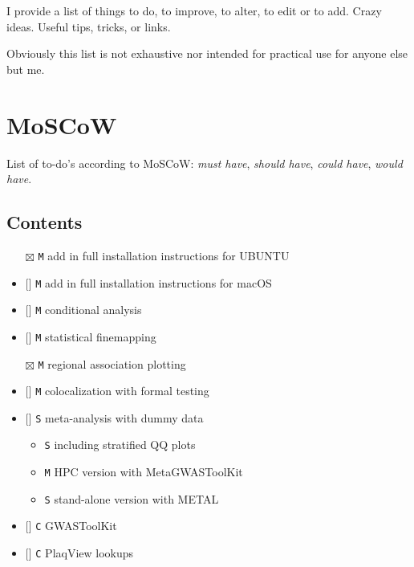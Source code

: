 \documentclass[
]{book}
\newcommand{\passthrough}[1]{#1}
\providecommand{\tightlist}{%
  \setlength{\itemsep}{0pt}\setlength{\parskip}{0pt}}
\begin{document}
I provide a list of things to do, to improve, to alter, to edit or to add. Crazy ideas. Useful tips, tricks, or links.

Obviously this list is not exhaustive nor intended for practical use for anyone else but me.

\hypertarget{moscow}{%
\section{MoSCoW}\label{moscow}}

List of to-do's according to MoSCoW: \emph{must have}, \emph{should have}, \emph{could have}, \emph{would have}.

\hypertarget{contents}{%
\subsection{Contents}\label{contents}}

\begin{itemize}
\tightlist
\item[$\boxtimes$]
  \passthrough{\lstinline!M!} add in full installation instructions for UBUNTU
\item
  {[}{]} \passthrough{\lstinline!M!} add in full installation instructions for macOS
\item
  {[}{]} \passthrough{\lstinline!M!} conditional analysis
\item
  {[}{]} \passthrough{\lstinline!M!} statistical finemapping
\item[$\boxtimes$]
  \passthrough{\lstinline!M!} regional association plotting
\item
  {[}{]} \passthrough{\lstinline!M!} colocalization with formal testing
\item
  {[}{]} \passthrough{\lstinline!S!} meta-analysis with dummy data

  \begin{itemize}
  \tightlist
  \item
    \passthrough{\lstinline!S!} including stratified QQ plots
  \item
    \passthrough{\lstinline!M!} HPC version with MetaGWASToolKit
  \item
    \passthrough{\lstinline!S!} stand-alone version with METAL
  \end{itemize}
\item
  {[}{]} \passthrough{\lstinline!C!} GWASToolKit
\item
  {[}{]} \passthrough{\lstinline!C!} PlaqView lookups
\end{itemize}
\end{document}
